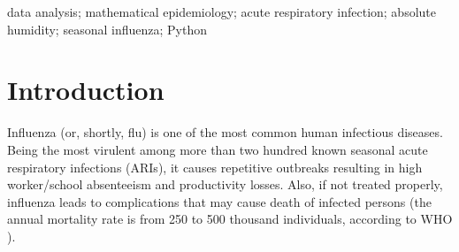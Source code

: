 \documentclass[3p,times,procedia]{elsarticle}
\begin{document}
\begin{frontmatter}
\begin{keyword}
data analysis; mathematical epidemiology; acute respiratory infection; absolute humidity; seasonal influenza; Python




\end{keyword}
\end{frontmatter}




\section{Introduction}
\label{sect:introduction}

Influenza (or, shortly, flu) is one of the most common human infectious diseases. Being the most virulent among more than two hundred known seasonal acute respiratory infections (ARIs), it causes repetitive outbreaks resulting in high worker/school absenteeism and productivity losses. Also, if not treated properly, influenza leads to complications that may cause death of infected persons (the annual mortality rate is from 250 to 500 thousand individuals, according to WHO \cite{who_flu_facts}).
\end{document}
